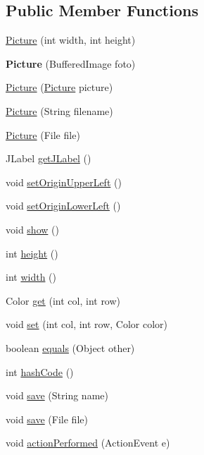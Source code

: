 \subsection*{Public Member Functions}
\begin{DoxyCompactItemize}
\item 
\hyperlink{class_picture_a07142473b84fdbdb91cb7025f7657027}{Picture} (int width, int height)
\item 
\hypertarget{class_picture_a4ecc0945f31dc27563195900e17c3a0a}{}{\bfseries Picture} (Buffered\+Image foto)\label{class_picture_a4ecc0945f31dc27563195900e17c3a0a}

\item 
\hyperlink{class_picture_ae1d35e34123c7658b727ca21bf79fec3}{Picture} (\hyperlink{class_picture}{Picture} picture)
\item 
\hyperlink{class_picture_a4ac461d816eb819710e51c139610ba68}{Picture} (String filename)
\item 
\hyperlink{class_picture_a1c4fa93e98dd54f073309a1e314b2ae9}{Picture} (File file)
\item 
J\+Label \hyperlink{class_picture_a23492bae036cfd015d79a0669f084bf5}{get\+J\+Label} ()
\item 
void \hyperlink{class_picture_a562666a5d8b36423da0aec5e92b9c078}{set\+Origin\+Upper\+Left} ()
\item 
void \hyperlink{class_picture_aa1513709f2fe6a54457294a5c271f9ef}{set\+Origin\+Lower\+Left} ()
\item 
void \hyperlink{class_picture_a7e2e47c6290831d31e9d0d6fae2e548d}{show} ()
\item 
int \hyperlink{class_picture_afca117450ab43ed8738b7ffa4fa6a2f7}{height} ()
\item 
int \hyperlink{class_picture_a4db9d5260d7c15056c85da767865b870}{width} ()
\item 
Color \hyperlink{class_picture_a8719d97ffafd78157647676cc4395f1d}{get} (int col, int row)
\item 
void \hyperlink{class_picture_a4e963f9fe2209d76d469428b458d6deb}{set} (int col, int row, Color color)
\item 
boolean \hyperlink{class_picture_af84a5e004ddf9d82121865290b049f97}{equals} (Object other)
\item 
int \hyperlink{class_picture_a768e1bf696a81fb573bd06c1a37df692}{hash\+Code} ()
\item 
void \hyperlink{class_picture_aba5d1df6955e8af12b889817fcab91af}{save} (String name)
\item 
void \hyperlink{class_picture_a0d547de85f185ad28e778ca0b108cf60}{save} (File file)
\item 
void \hyperlink{class_picture_addcd776af429ddb0593b63a6c8fb3253}{action\+Performed} (Action\+Event e)
\end{DoxyCompactItemize}
